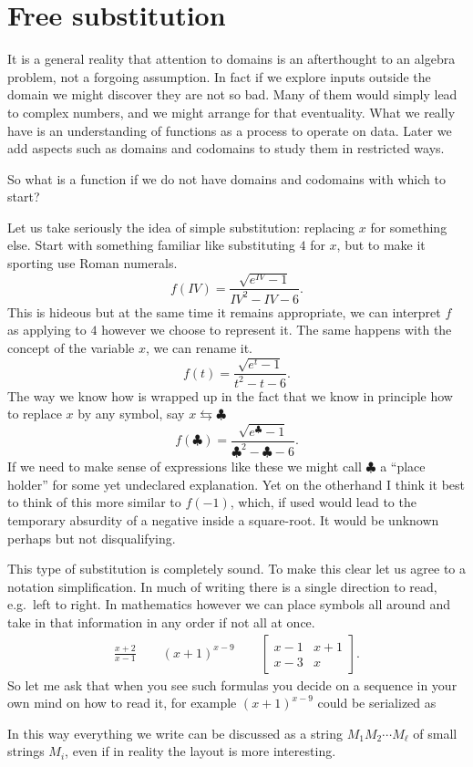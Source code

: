 \section{Free substitution}

It is a general reality that attention to domains is an af\-ter\-thought to an
algebra problem, not a forgoing assumption.  In fact if we explore inputs
outside the domain we might discover they are not so bad.  Many of them would
simply lead to complex numbers, and we might arrange for that eventuality.  
What we really have is an understanding of functions as a process to operate 
on data.  Later  we add aspects such as domains and codomains to study them in restricted ways.

So what is a function if we do not have domains and codomains with which to start?

Let us take seriously the idea of simple substitution: replacing $x$ for something else.
Start with something familiar like substituting $4$ for $x$, but to make 
it sporting use Roman numerals.
\[
    f(IV) = \frac{\sqrt{e^{IV}-1}}{IV^2-IV-6}.
\]
This is hideous but at the same time it remains appropriate, we can interpret 
$f$ as applying to $4$ however we choose to represent it.  The same happens with 
the concept of the variable $x$, we can rename it.
\[
    f(t) = \frac{\sqrt{e^{t}-1}}{t^2-t-6}.
\]
The way we know how is wrapped up in the fact that we know 
in principle how to replace $x$ by any symbol, say $x\leftrightarrows \clubsuit$
\[
    f(\clubsuit) = \frac{\sqrt{e^{\clubsuit}-1}}{\clubsuit^2-\clubsuit-6}.
\]
If we need to make sense of expressions like these we might call $\clubsuit$ 
a ``place holder'' for some yet undeclared explanation.  Yet on the otherhand 
I think it best to think of this more similar to  $f(-1)$, which, if used 
would lead to the temporary absurdity of a negative inside a square-root.
It would be unknown perhaps but not disqualifying.

This type of substitution is completely sound.  To make this clear let us agree 
to a notation simplification.  In much of writing there is a single direction 
to read, e.g.\ left to right.  In mathematics however we can place symbols 
all around and take in that information in any order if not all at once.
\begin{align*}
    \frac{x+2}{x-1} \qquad (x+1)^{x-9} \qquad \begin{bmatrix} x-1 & x+1\\ x-3 & x \end{bmatrix}.
\end{align*}
So let me ask that when you see such formulas you decide on a sequence in your own mind 
on how to 
read it, for example $(x+1)^{x-9}$ could be serialized as 
\begin{center}
\end{center}
In this way everything we write can be discussed as a string $M_1 M_2\cdots M_{\ell}$
of small strings $M_i$, even if in reality the layout is more interesting.

